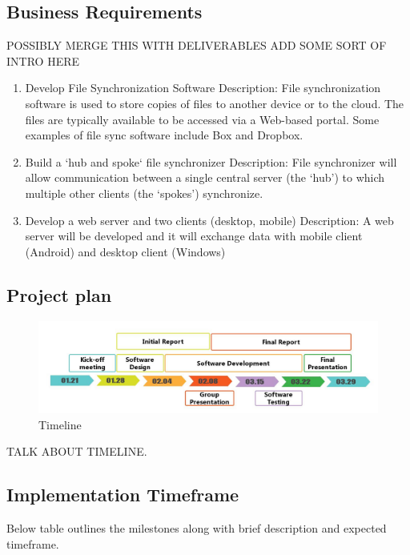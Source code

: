 \documentclass{article}
\begin{document}
\subsection{Business Requirements}
POSSIBLY MERGE THIS WITH DELIVERABLES
ADD SOME SORT OF INTRO HERE
\begin{enumerate}
  \item Develop File Synchronization Software
  Description:  File synchronization software is used to store copies of files to another device or to the cloud. The files are typically available to be accessed via a Web-based portal. Some examples of file sync software include Box and Dropbox.
  \item Build a ‘hub and spoke‘ file synchronizer
  Description: File synchronizer will allow communication between a single central server (the ‘hub’) to which multiple other clients (the ‘spokes’) synchronize.
  \item Develop a web server and two clients (desktop, mobile)
  Description: A web server will be developed and it will exchange data with mobile client (Android) and desktop client (Windows)
\end{enumerate}


\subsection{Project plan}

\begin{figure}[h]
    \centering
    \includegraphics[width=1\textwidth]{timeline}
    \caption{Timeline}
    \label{fig:timeline1}
\end{figure}

TALK ABOUT TIMELINE.

\subsection{Implementation Timeframe}
Below table outlines the milestones along with brief description and expected timeframe.
\end{document}
